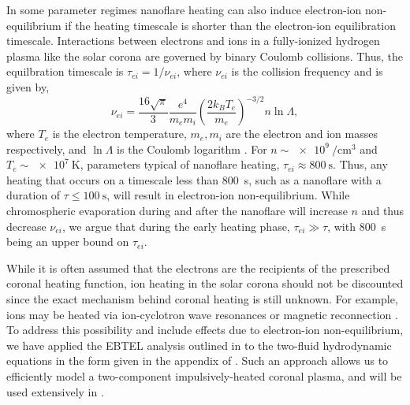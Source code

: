 In some parameter regimes nanoflare heating can also induce electron-ion non-equilibrium if the heating timescale is shorter than the electron-ion equilibration timescale. Interactions between electrons and ions in a fully-ionized hydrogen plasma like the solar corona are governed by binary Coulomb collisions. Thus, the equilbration timescale is $\tau_{ei}=1/\nu_{ei}$, where $\nu_{ei}$ is the collision frequency and is given by,
\begin{equation}\label{eq:col_freq}
    \nu_{ei} = \frac{16\sqrt{\pi}}{3}\frac{e^4}{m_em_i}\left(\frac{2k_BT_e}{m_e}\right)^{-3/2}n\ln{\Lambda},
\end{equation}
where $T_e$ is the electron temperature, $m_e,m_i$ are the electron and ion masses respectively, and $\ln{\Lambda}$ is the Coulomb logarithm \citep[see both Eq. 2.5e and Section 3 of][]{braginskii_transport_1965}. For $n\sim\SI{e9}{\per\cubic\cm}$ and $T_e\sim\SI{e7}{\kelvin}$, parameters typical of nanoflare heating, $\tau_{ei}\approx\SI{800}{\second}$. Thus, any heating that occurs on a timescale less than \SI{800}{\second}, such as a nanoflare with a duration of $\tau\le\SI{100}{\second}$, will result in electron-ion non-equilibrium. While chromospheric evaporation during and after the nanoflare will increase $n$ and thus decrease $\nu_{ei}$, we argue that during the early heating phase, $\tau_{ei}\gg\tau$, with \SI{800}{\second} being an upper bound on $\tau_{ei}$.

While it is often assumed that the electrons are the recipients of the prescribed coronal heating function, ion heating in the solar corona should not be discounted since the exact mechanism behind coronal heating is still unknown. For example, ions may be heated via ion-cyclotron wave resonances \citep[e.g.][]{markovskii_intermittent_2004} or magnetic reconnection \citep[e.g.][]{ono_ion_1996,drake_onset_2014}. To address this possibility and include effects due to electron-ion non-equilibrium, we have applied the EBTEL analysis outlined in \citet{klimchuk_highly_2008} to the two-fluid hydrodynamic equations in the form given in the appendix of \citet{bradshaw_influence_2013}. Such an approach allows us to efficiently model a two-component impulsively-heated coronal plasma, and will be used extensively in .

